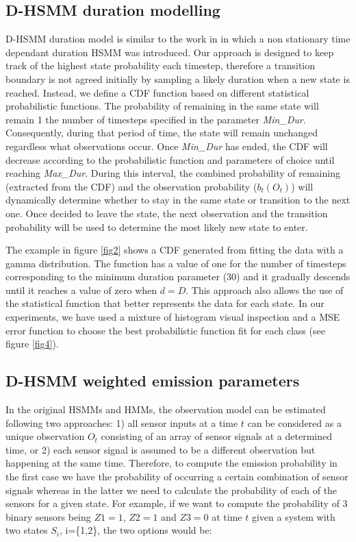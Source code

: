 \documentclass[conference]{IEEEtran}
\begin{document}
\subsection{D-HSMM duration modelling}
D-HSMM duration model is similar to the work in \cite{Marhasev2006} in which a non stationary time dependant duration HSMM was introduced. Our approach is designed to keep track of the highest state probability each timestep, therefore a transition boundary is not agreed initially by sampling a likely duration when a new state is reached. Instead, we define a CDF function based on different statistical probabilistic functions. The probability of remaining in the same state will remain 1 the number of timesteps specified in the parameter \textit{Min\_Dur}. Consequently, during that period of time, the state will remain unchanged regardless what observations occur. Once \textit{Min\_Dur} has ended, the CDF will decrease according to the probabilistic function and parameters of choice until reaching \textit{Max\_Dur}. During this interval, the combined probability of remaining (extracted from the CDF) and the observation probability ($b_t(O_t)$) will dynamically determine whether to stay in the same state or transition to the next one. Once decided to leave the state, the next observation and the transition probability will be used to determine the most likely new state to enter.

The example in figure \ref{fig2} shows a CDF generated from fitting the data with a gamma distribution. The function has a value of one for the number of timesteps corresponding to the minimum duration parameter (30) and it gradually descends until it reaches a value of zero when $d=D$. This approach also allows the use of the statistical function that better represents the data for each state. In our experiments, we have used a mixture of histogram visual inspection and a MSE error function to choose the best probabilistic function fit for each class (see figure \ref{fig4}).

\subsection{D-HSMM weighted emission parameters}

In the original HSMMs and HMMs, the observation model can be estimated following two approaches: 1) all sensor inputs at a time $t$ can be considered as a unique observation $O_t$ consisting of an array of sensor signals at a determined time, or 2) each sensor signal is assumed to be a different observation but happening at the same time. Therefore, to compute the emission probability in the first case we have the probability of occurring a certain combination of sensor signals whereas in the latter we need to calculate the probability of each of the sensors for a given state. For example, if we want to compute the probability of 3 binary sensors being $Z1=1$, $Z2=1$ and $Z3=0$ at time $t$ given a system with two states $S_i$, i=\{1,2\}, the two options would be: 
\end{document}
